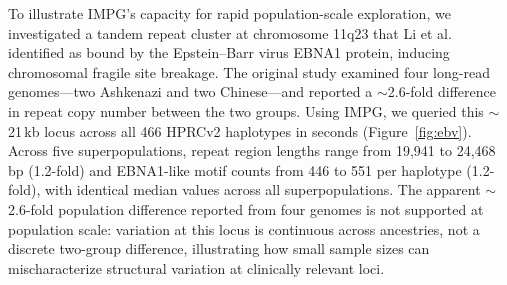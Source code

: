 
To illustrate IMPG's capacity for rapid population-scale exploration, we investigated a tandem repeat cluster at chromosome 11q23 that Li et al.\ \cite{Li2023} identified as bound by the Epstein--Barr virus EBNA1 protein, inducing chromosomal fragile site breakage. The original study examined four long-read genomes---two Ashkenazi and two Chinese---and reported a $\sim$2.6-fold difference in repeat copy number between the two groups. Using IMPG, we queried this $\sim$21\,kb locus across all 466 HPRCv2 haplotypes in seconds (Figure~\ref{fig:ebv}). Across five superpopulations, repeat region lengths range from 19,941 to 24,468\,bp (1.2-fold) and EBNA1-like motif counts from 446 to 551 per haplotype (1.2-fold), with identical median values across all superpopulations. The apparent $\sim$2.6-fold population difference reported from four genomes is not supported at population scale: variation at this locus is continuous across ancestries, not a discrete two-group difference, illustrating how small sample sizes can mischaracterize structural variation at clinically relevant loci.

